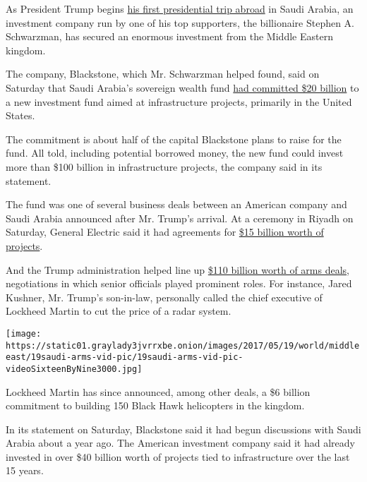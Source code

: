 As President Trump begins
\href{https://www.nytimes3xbfgragh.onion/2017/05/20/world/middleeast/donald-trump-saudi-arabia.html}{his
first presidential trip abroad} in Saudi Arabia, an investment company
run by one of his top supporters, the billionaire Stephen A. Schwarzman,
has secured an enormous investment from the Middle Eastern kingdom.

The company, Blackstone, which Mr. Schwarzman helped found, said on
Saturday that Saudi Arabia's sovereign wealth fund
\href{https://www.blackstone.com/media/press-releases/blackstone-to-launch-$40-billion-infrastructure-investment-vehicle-and-new-infrastructure-business}{had
committed \$20 billion} to a new investment fund aimed at infrastructure
projects, primarily in the United States.

The commitment is about half of the capital Blackstone plans to raise
for the fund. All told, including potential borrowed money, the new fund
could invest more than \$100 billion in infrastructure projects, the
company said in its statement.

The fund was one of several business deals between an American company
and Saudi Arabia announced after Mr. Trump's arrival. At a ceremony in
Riyadh on Saturday, General Electric said it had agreements for
\href{http://www.genewsroom.com/press-releases/support-saudi-vision-2030-saudi-arabia-and-ge-announce-raft-mous-and-agreements-worth}{\$15
billion worth of projects}.

And the Trump administration helped line up
\href{https://www.nytimes3xbfgragh.onion/2017/05/18/world/middleeast/jared-kushner-saudi-arabia-arms-deal-lockheed.html}{\$110
billion worth of arms deals}, negotiations in which senior officials
played prominent roles. For instance, Jared Kushner, Mr. Trump's
son-in-law, personally called the chief executive of Lockheed Martin to
cut the price of a radar system.

\texttt{[image: https://static01.graylady3jvrrxbe.onion/images/2017/05/19/world/middleeast/19saudi-arms-vid-pic/19saudi-arms-vid-pic-videoSixteenByNine3000.jpg]}

Lockheed Martin has since announced, among other deals, a \$6 billion
commitment to building 150 Black Hawk helicopters in the kingdom.

In its statement on Saturday, Blackstone said it had begun discussions
with Saudi Arabia about a year ago. The American investment company said
it had already invested in over \$40 billion worth of projects tied to
infrastructure over the last 15 years.

